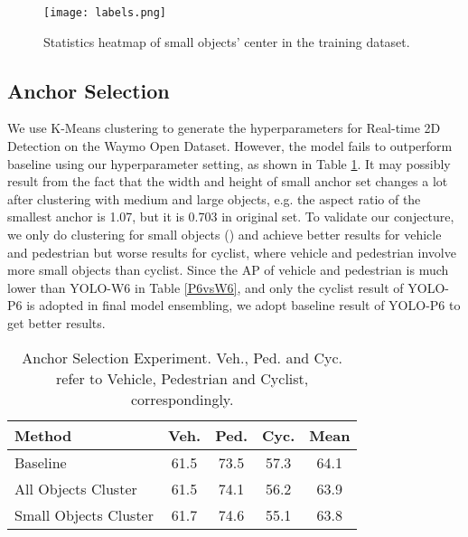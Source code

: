 \documentclass[final]{cvpr}
\begin{document}
\begin{figure}
    \centering
    \texttt{[image: labels.png]}
    \caption{Statistics heatmap of small objects' center in the training dataset.}
    \label{heatmap}
\end{figure}
\subsection{Anchor Selection}
We use K-Means clustering to generate the hyperparameters for Real-time 2D Detection on the Waymo Open Dataset. However, the model fails to outperform baseline using our hyperparameter setting, as shown in Table \ref{anchorselection}. It may possibly result from the fact that the width and height of small anchor set changes a lot after clustering with medium and large objects, e.g. the aspect ratio of the smallest anchor is 1.07, but it is 0.703 in original set. To validate our conjecture, we only do clustering for small objects () and achieve better results for vehicle and pedestrian but worse results for cyclist, where vehicle and pedestrian involve more small objects than cyclist. Since the AP of vehicle and pedestrian is much lower than YOLO-W6 in Table \ref{P6vsW6}, and only the cyclist result of YOLO-P6 is adopted in final model ensembling, we adopt baseline result of YOLO-P6 to get better results.

\begin{table}[h]
\begin{center}
\caption{Anchor Selection Experiment. Veh., Ped. and Cyc. refer to Vehicle, Pedestrian and Cyclist, correspondingly.}
\begin{tabular}{l|c|c|c|c}
\hline
Method  & Veh. & Ped. & Cyc. & Mean \\
\hline
Baseline & 61.5 & 73.5 & 57.3 & 64.1  \\
All Objects Cluster & 61.5 & 74.1 & 56.2 & 63.9 \\
Small Objects Cluster & 61.7 & 74.6 & 55.1 & 63.8\\
\hline
\end{tabular}
\label{anchorselection}
\end{center}
\end{table}
\end{document}
